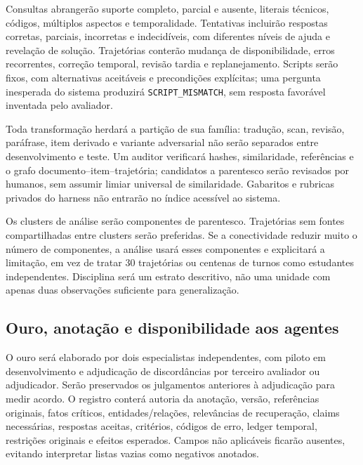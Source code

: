 \documentclass[12pt]{article}
\newcommand{\code}[1]{\nolinkurl{#1}}
\begin{document}
Consultas abrangerão suporte completo, parcial e ausente, literais técnicos, códigos, múltiplos aspectos e temporalidade. Tentativas incluirão respostas corretas, parciais, incorretas e indecidíveis, com diferentes níveis de ajuda e revelação de solução. Trajetórias conterão mudança de disponibilidade, erros recorrentes, correção temporal, revisão tardia e replanejamento. Scripts serão fixos, com alternativas aceitáveis e precondições explícitas; uma pergunta inesperada do sistema produzirá \code{SCRIPT_MISMATCH}, sem resposta favorável inventada pelo avaliador.

Toda transformação herdará a partição de sua família: tradução, scan, revisão, paráfrase, item derivado e variante adversarial não serão separados entre desenvolvimento e teste. Um auditor verificará hashes, similaridade, referências e o grafo documento--item--trajetória; candidatos a parentesco serão revisados por humanos, sem assumir limiar universal de similaridade. Gabaritos e rubricas privados do harness não entrarão no índice acessível ao sistema.

Os clusters de análise serão componentes de parentesco. Trajetórias sem fontes compartilhadas entre clusters serão preferidas. Se a conectividade reduzir muito o número de componentes, a análise usará esses componentes e explicitará a limitação, em vez de tratar 30 trajetórias ou centenas de turnos como estudantes independentes. Disciplina será um estrato descritivo, não uma unidade com apenas duas observações suficiente para generalização.

\subsection{Ouro, anotação e disponibilidade aos agentes}

O ouro será elaborado por dois especialistas independentes, com piloto em desenvolvimento e adjudicação de discordâncias por terceiro avaliador ou adjudicador. Serão preservados os julgamentos anteriores à adjudicação para medir acordo. O registro conterá autoria da anotação, versão, referências originais, fatos críticos, entidades/relações, relevâncias de recuperação, claims necessárias, respostas aceitas, critérios, códigos de erro, ledger temporal, restrições originais e efeitos esperados. Campos não aplicáveis ficarão ausentes, evitando interpretar listas vazias como negativos anotados.
\end{document}
